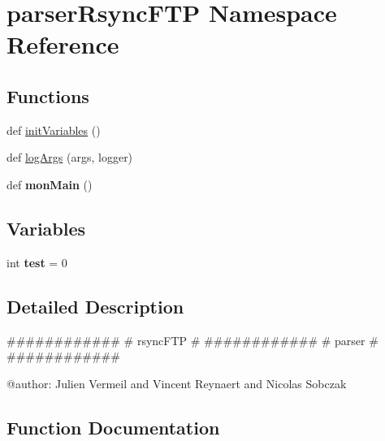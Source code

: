 \hypertarget{namespaceparser_rsync_f_t_p}{}\section{parser\+Rsync\+F\+TP Namespace Reference}
\label{namespaceparser_rsync_f_t_p}
\subsection*{Functions}
\begin{DoxyCompactItemize}
\item 
def \hyperlink{namespaceparser_rsync_f_t_p_a0e73b909879252022af61a25a8073f72}{init\+Variables} ()
\item 
def \hyperlink{namespaceparser_rsync_f_t_p_a5f7efa75f1e14cae53a2f58b147efc39}{log\+Args} (args, logger)
\item 
def {\bfseries mon\+Main} ()\hypertarget{namespaceparser_rsync_f_t_p_a72974d92e41942617e9b7eef63a2fadb}{}\label{namespaceparser_rsync_f_t_p_a72974d92e41942617e9b7eef63a2fadb}

\end{DoxyCompactItemize}
\subsection*{Variables}
\begin{DoxyCompactItemize}
\item 
int {\bfseries test} = 0\hypertarget{namespaceparser_rsync_f_t_p_a42e140eb04d78822d9c8b38fe810c068}{}\label{namespaceparser_rsync_f_t_p_a42e140eb04d78822d9c8b38fe810c068}

\end{DoxyCompactItemize}


\subsection{Detailed Description}
\begin{DoxyVerb}############
# rsyncFTP #
############
# parser   #
############

@author: Julien Vermeil and Vincent Reynaert and Nicolas Sobczak
\end{DoxyVerb}
 

\subsection{Function Documentation}
